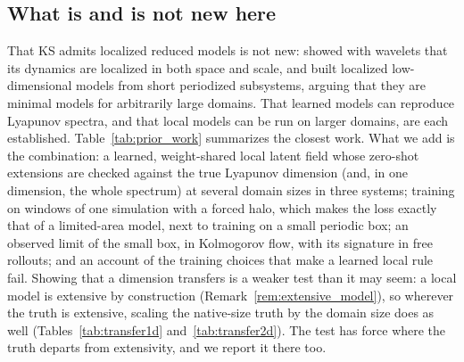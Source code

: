 \subsection{What is and is not new here}
\label{sec:bg_novelty}

That KS admits localized reduced models is not new:
\citet{wittenberg1999} showed with wavelets that its dynamics are
localized in both space and scale, and \citet{wittenberg2001} built
localized low-dimensional models from short periodized subsystems,
arguing that they are minimal models for arbitrarily large domains. That
learned models can reproduce Lyapunov spectra, and that local models can be
run on larger domains, are each established. Table~\ref{tab:prior_work}
summarizes the closest work. What we add is the combination: a learned,
weight-shared local latent field whose zero-shot extensions are checked
against the true Lyapunov dimension (and, in one dimension, the whole
spectrum) at several domain sizes in three systems; training on windows
of one simulation with a forced halo, which makes the loss exactly that
of a limited-area model, next to training on a small periodic box; an
observed limit of the small box, in Kolmogorov flow, with its
signature in free rollouts; and an account of the training choices that
make a learned local rule fail. Showing that a dimension transfers is a
weaker test than it may seem: a local model is extensive by construction
(Remark~\ref{rem:extensive_model}), so wherever the truth is extensive,
scaling the native-size truth by the domain size does as well
(Tables~\ref{tab:transfer1d} and~\ref{tab:transfer2d}). The test has
force where the truth departs from extensivity, and we report it there
too.

